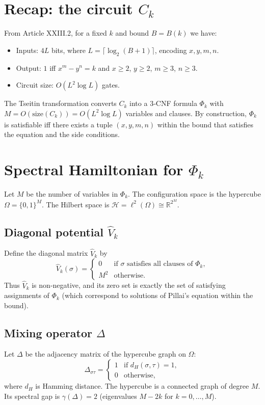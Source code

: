 \documentclass[11pt,a4paper]{article}
\begin{document}
\section{Recap: the circuit $C_k$}

From Article XXIII.2, for a fixed $k$ and bound $B = B(k)$ we have:
\begin{itemize}
\item Inputs: $4L$ bits, where $L = \lceil \log_2(B+1)\rceil$, encoding $x,y,m,n$.
\item Output: $1$ iff $x^m - y^n = k$ and $x\ge2$, $y\ge2$, $m\ge3$, $n\ge3$.
\item Circuit size: $O(L^2 \log L)$ gates.
\end{itemize}

The Tseitin transformation converts $C_k$ into a 3‑CNF formula $\Phi_k$ with $M = O(\text{size}(C_k)) = O(L^2 \log L)$ variables and clauses. By construction, $\Phi_k$ is satisfiable iff there exists a tuple $(x,y,m,n)$ within the bound that satisfies the equation and the side conditions.

\section{Spectral Hamiltonian for $\Phi_k$}

Let $M$ be the number of variables in $\Phi_k$. The configuration space is the hypercube $\Omega = \{0,1\}^M$. The Hilbert space is $\mathcal{H} = \ell^2(\Omega) \cong \mathbb{R}^{2^M}$.

\subsection{Diagonal potential $\hat{V}_k$}
Define the diagonal matrix $\hat{V}_k$ by
\[
\hat{V}_k(\sigma) = \begin{cases}
0 & \text{if }\sigma\text{ satisfies all clauses of } \Phi_k,\\
M^2 & \text{otherwise}.
\end{cases}
\]
Thus $\hat{V}_k$ is non‑negative, and its zero set is exactly the set of satisfying assignments of $\Phi_k$ (which correspond to solutions of Pillai's equation within the bound).

\subsection{Mixing operator $\Delta$}
Let $\Delta$ be the adjacency matrix of the hypercube graph on $\Omega$:
\[
\Delta_{\sigma\tau} = \begin{cases}
1 & \text{if } d_H(\sigma,\tau)=1,\\
0 & \text{otherwise},
\end{cases}
\]
where $d_H$ is Hamming distance. The hypercube is a connected graph of degree $M$. Its spectral gap is $\gamma(\Delta)=2$ (eigenvalues $M-2k$ for $k=0,\dots,M$).
\end{document}
